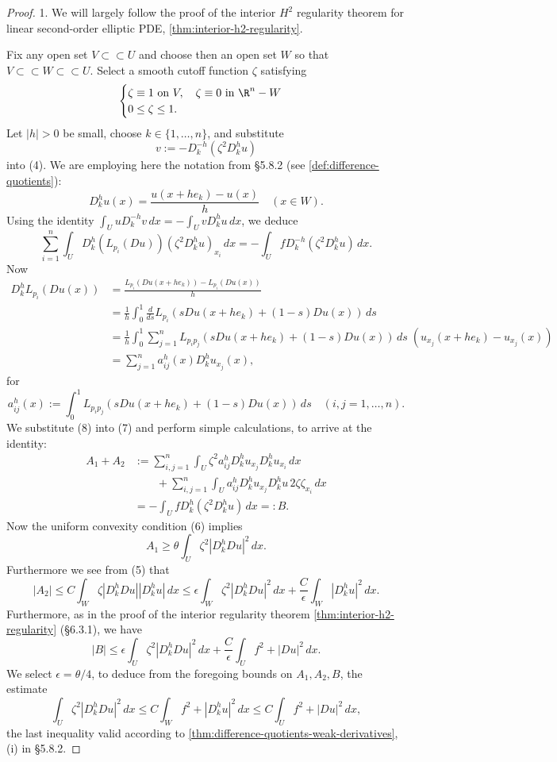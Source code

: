 \begin{proof}
1. We will largely follow the proof of the interior $H^2$ regularity theorem for linear second-order elliptic PDE, \cref{thm:interior-h2-regularity}.

Fix any open set $V \subset\subset U$ and choose then an open set $W$ so that $V \subset\subset W \subset\subset U$. Select a smooth cutoff function $\zeta$ satisfying
\[
\begin{cases}
\zeta \equiv 1 \text{ on } V, \quad \zeta \equiv 0 \text{ in } \R^n - W \\
0 \le \zeta \le 1.
\end{cases}
\]
Let $|h| > 0$ be small, choose $k \in \{1,\ldots,n\}$, and substitute
\[
v := -D_k^{-h}(\zeta^2 D_k^h u)
\]
into (4). We are employing here the notation from \S5.8.2 (see \cref{def:difference-quotients}):
\[
D_k^h u(x) = \frac{u(x+he_k) - u(x)}{h} \quad (x \in W).
\]
Using the identity $\int_U u D_k^{-h} v\, dx = -\int_U v D_k^h u\, dx$, we deduce
\[
\sum_{i=1}^n \int_U D_k^h(L_{p_i}(Du))(\zeta^2 D_k^h u)_{x_i}\, dx = -\int_U f D_k^{-h}(\zeta^2 D_k^h u)\, dx.
\tag{7}
\]
Now
\[
\begin{aligned}
D_k^h L_{p_i}(Du(x)) &= \frac{L_{p_i}(Du(x+he_k)) - L_{p_i}(Du(x))}{h} \\
&= \frac{1}{h}\int_0^1 \frac{d}{ds} L_{p_i}(sDu(x+he_k) + (1-s)Du(x))\, ds \\
&= \frac{1}{h}\int_0^1 \sum_{j=1}^n L_{p_ip_j}(sDu(x+he_k)+(1-s)Du(x))\, ds \; (u_{x_j}(x+he_k) - u_{x_j}(x)) \\
&= \sum_{j=1}^n a_{ij}^h(x) D_k^h u_{x_j}(x),
\end{aligned}
\tag{8}
\]
for
\[
a_{ij}^h(x) := \int_0^1 L_{p_ip_j}(sDu(x+he_k) + (1-s)Du(x))\, ds \quad (i,j=1,\ldots,n).
\tag{9}
\]
We substitute (8) into (7) and perform simple calculations, to arrive at the identity:
\[
\begin{aligned}
A_1 + A_2 &:= \sum_{i,j=1}^n \int_U \zeta^2 a_{ij}^h D_k^h u_{x_j} D_k^h u_{x_i}\, dx \\
&\qquad + \sum_{i,j=1}^n \int_U a_{ij}^h D_k^h u_{x_j} D_k^h u\, 2\zeta\zeta_{x_i}\, dx \\
&= -\int_U f D_k^h(\zeta^2 D_k^h u)\, dx =: B.
\end{aligned}
\tag{10}
\]
Now the uniform convexity condition (6) implies
\[
A_1 \ge \theta \int_U \zeta^2 |D_k^h Du|^2\, dx.
\tag{11}
\]
Furthermore we see from (5) that
\[
|A_2| \le C\int_W \zeta |D_k^h Du||D_k^h u|\, dx \le \epsilon \int_W \zeta^2|D_k^h Du|^2\, dx + \frac{C}{\epsilon}\int_W |D_k^h u|^2\, dx.
\tag{12}
\]
Furthermore, as in the proof of the interior regularity theorem \cref{thm:interior-h2-regularity} (\S6.3.1), we have
\[
|B| \le \epsilon \int_U \zeta^2 |D_k^h Du|^2\, dx + \frac{C}{\epsilon}\int_U f^2 + |Du|^2\, dx.
\]
We select $\epsilon = \theta/4$, to deduce from the foregoing bounds on $A_1, A_2, B$, the estimate
\[
\int_U \zeta^2 |D_k^h Du|^2\, dx \le C\int_W f^2 + |D_k^h u|^2\, dx \le C\int_U f^2 + |Du|^2\, dx,
\]
the last inequality valid according to \cref{thm:difference-quotients-weak-derivatives},(i) in \S5.8.2.


\end{proof}
